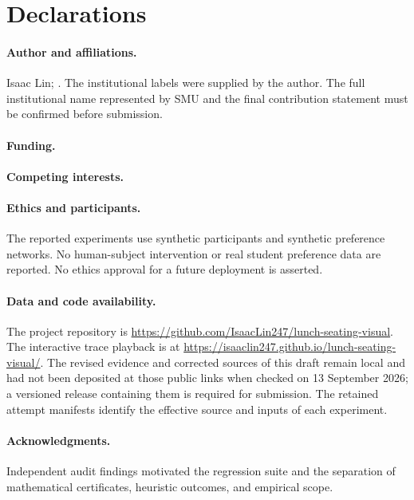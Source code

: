 \documentclass[11pt,a4paper]{article}
\theoremstyle{definition}\newtheorem{definition}[theorem]{Definition}
\theoremstyle{remark}\newtheorem{remark}[theorem]{Remark}
\begin{document}
\section*{Declarations}
\paragraph{Author and affiliations.} Isaac Lin; \AuthorAffiliations. The institutional labels were supplied by the author. The full institutional name represented by SMU and the final contribution statement must be confirmed before submission.
\paragraph{Funding.} \FundingDeclaration
\paragraph{Competing interests.} \ConflictDeclaration
\paragraph{Ethics and participants.} The reported experiments use synthetic participants and synthetic preference networks. No human-subject intervention or real student preference data are reported. No ethics approval for a future deployment is asserted.
\paragraph{Data and code availability.} The project repository is \url{https://github.com/IsaacLin247/lunch-seating-visual}. The interactive trace playback is at \url{https://isaaclin247.github.io/lunch-seating-visual/}. The revised evidence and corrected sources of this draft remain local and had not been deposited at those public links when checked on 13 September 2026; a versioned release containing them is required for submission. The retained attempt manifests identify the effective source and inputs of each experiment.
\paragraph{Acknowledgments.} Independent audit findings motivated the regression suite and the separation of mathematical certificates, heuristic outcomes, and empirical scope.



\appendix
\end{document}
